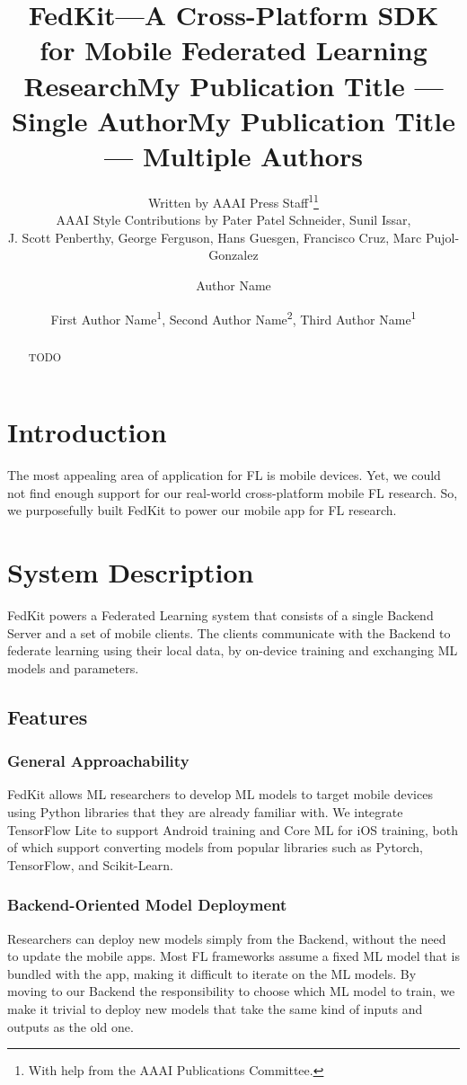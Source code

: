 \documentclass[letterpaper]{article} %
\title{FedKit---A Cross-Platform SDK for Mobile Federated Learning Research}
\author{
    Written by AAAI Press Staff\textsuperscript{\rm 1}\thanks{With help from the AAAI Publications Committee.}\\
    AAAI Style Contributions by Pater Patel Schneider,
    Sunil Issar,\\
    J. Scott Penberthy,
    George Ferguson,
    Hans Guesgen,
    Francisco Cruz\equalcontrib,
    Marc Pujol-Gonzalez\equalcontrib
}
\title{My Publication Title --- Single Author}
\author {
    Author Name
}
\title{My Publication Title --- Multiple Authors}
\author {
    First Author Name\textsuperscript{\rm 1},
    Second Author Name\textsuperscript{\rm 2},
    Third Author Name\textsuperscript{\rm 1}
}
\begin{document}
\maketitle

\begin{abstract}
    TODO
\end{abstract}

\section{Introduction}
The most appealing area of application for FL is mobile devices.
Yet, we could not find enough support for our real-world cross-platform mobile
FL research.
So, we purposefully built FedKit to power our mobile app for FL research.

\section{System Description}

\newcommand{\model}{$M$}
\newcommand{\fs}{$S_F$}

FedKit powers a Federated Learning system that
consists of a single Backend Server and a set of mobile clients.
The clients communicate with the Backend to federate learning
using their local data,
by on-device training and exchanging ML models and parameters.

\subsection{Features}

\subsubsection{General Approachability}
FedKit allows ML researchers to develop ML models to target mobile devices
using Python libraries that they are already familiar with.
We integrate TensorFlow Lite to support Android training and Core ML for iOS
training,
both of which support converting models from popular libraries such as Pytorch,
TensorFlow, and Scikit-Learn.

\subsubsection{Backend-Oriented Model Deployment}
Researchers can deploy new models simply from the Backend,
without the need to update the mobile apps.
Most FL frameworks assume a fixed ML model that is bundled with the app,
making it difficult to iterate on the ML models.
By moving to our Backend the responsibility to choose which ML model to train,
we make it trivial to deploy new models that take the same kind of inputs and
outputs as the old one.
\end{document}
